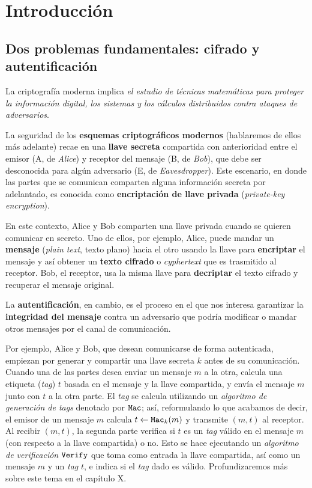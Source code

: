 \section{Introducción}

\subsection{Dos problemas fundamentales: cifrado y autentificación}

La criptografía moderna implica \textit{el estudio de técnicas matemáticas para proteger la información digital, los sistemas y los cálculos distribuidos contra ataques de adversarios}. \medbreak

La seguridad de los \textbf{esquemas criptográficos modernos} (hablaremos de ellos más adelante) recae en una \textbf{llave secreta} compartida con anterioridad entre el emisor (A, de \textit{Alice}) y receptor del mensaje (B, de \textit{Bob}), que debe ser desconocida para algún adversario (E, de \textit{Eavesdropper}). Este escenario, en donde las partes que se comunican comparten alguna información secreta por adelantado, es conocida como \textbf{encriptación de llave privada} (\textit{private-key encryption}). \medbreak

En este contexto, Alice y Bob comparten una llave privada cuando se quieren comunicar en secreto. Uno de ellos, por ejemplo, Alice, puede mandar un \textbf{mensaje} (\textit{plain text}, texto plano) hacia el otro usando la llave para \textbf{encriptar} el mensaje y así obtener un \textbf{texto cifrado} o \textit{cyphertext} que es trasmitido al receptor. Bob, el receptor, usa la misma llave para \textbf{decriptar} el texto cifrado y recuperar el mensaje original.


La \textbf{autentificación}, en cambio, es el proceso en el que nos interesa garantizar la \textbf{integridad del mensaje} contra un adversario que podría modificar o mandar otros mensajes por el canal de comunicación. \medbreak

Por ejemplo, Alice y Bob, que desean comunicarse de forma autenticada, empiezan por generar y compartir una llave secreta $k$ antes de su comunicación. Cuando una de las partes desea enviar un mensaje $m$ a la otra, calcula una etiqueta (\textit{tag}) $t$ basada en el mensaje y la llave compartida, y envía el mensaje $m$ junto con $t$ a la otra parte. El \textit{tag} se calcula utilizando un \textit{algoritmo de generación de tags} denotado por $\texttt{Mac}$; así, reformulando lo que acabamos de decir, el emisor de un mensaje $m$ calcula $t \leftarrow \texttt{Mac}_k(m)$ y transmite $(m, t)$ al receptor. Al recibir $(m, t)$, la segunda parte verifica si $t$ es un \textit{tag} válido en el mensaje $m$ (con respecto a la llave compartida) o no. Esto se hace ejecutando un \textit{algoritmo de verificación} $\texttt{Verify}$ que toma como entrada la llave compartida, así como un mensaje $m$ y un \textit{tag} $t$, e indica si el \textit{tag} dado es válido. Profundizaremos más sobre este tema en el capítulo X.

